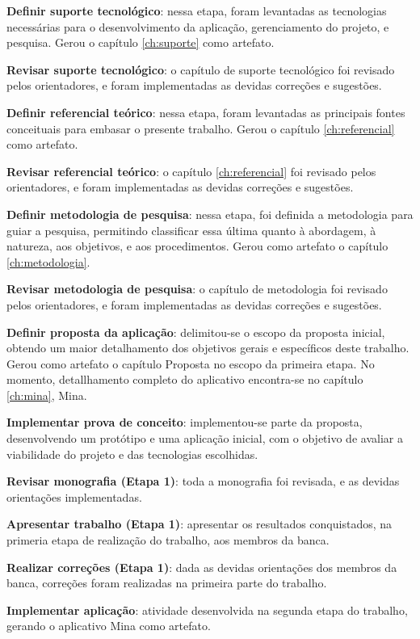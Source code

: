\textbf{Definir suporte tecnológico}: nessa etapa, foram levantadas as tecnologias necessárias para o desenvolvimento da 
aplicação, gerenciamento do projeto, e pesquisa. Gerou o capítulo \ref{ch:suporte} como artefato.

\textbf{Revisar suporte tecnológico}: o capítulo de suporte tecnológico foi revisado pelos orientadores, e foram implementadas as devidas correções e sugestões.

\textbf{Definir referencial teórico}: nessa etapa, foram levantadas as principais fontes conceituais para embasar o presente trabalho. Gerou o capítulo \ref{ch:referencial} como artefato.

\textbf{Revisar referencial teórico}: o capítulo \ref{ch:referencial} foi revisado pelos orientadores, e foram implementadas as devidas correções e sugestões.

\textbf{Definir metodologia de pesquisa}: nessa etapa, foi definida a metodologia 
para guiar a pesquisa, permitindo classificar essa última quanto
à abordagem, à natureza, aos objetivos, e aos procedimentos. Gerou como artefato o capítulo \ref{ch:metodologia}.

\textbf{Revisar metodologia de pesquisa}: o capítulo de metodologia foi revisado pelos orientadores, e foram implementadas as devidas correções e sugestões.

\textbf{Definir proposta da aplicação}: delimitou-se o escopo da proposta inicial, obtendo um maior detalhamento 
dos objetivos gerais e específicos deste trabalho. Gerou como artefato o capítulo Proposta no 
escopo da primeira etapa. No momento, detallhamento completo do aplicativo encontra-se no capítulo \ref{ch:mina}, Mina.

\textbf{Implementar prova de conceito}: implementou-se parte da proposta, desenvolvendo um protótipo e uma aplicação inicial, com o objetivo 
de avaliar a viabilidade do projeto e das tecnologias escolhidas.

\textbf{Revisar monografia (Etapa 1)}: toda a monografia foi revisada, e as devidas orientações implementadas.
 
\textbf{Apresentar trabalho (Etapa 1)}: apresentar os resultados conquistados, na primeria etapa 
de realização do trabalho, aos membros da banca.

\textbf{Realizar correções (Etapa 1)}: dada as devidas orientações dos membros da banca, correções 
foram realizadas na primeira parte do trabalho.

\textbf{Implementar aplicação}: atividade desenvolvida na segunda etapa do trabalho, 
gerando o aplicativo Mina como artefato.

